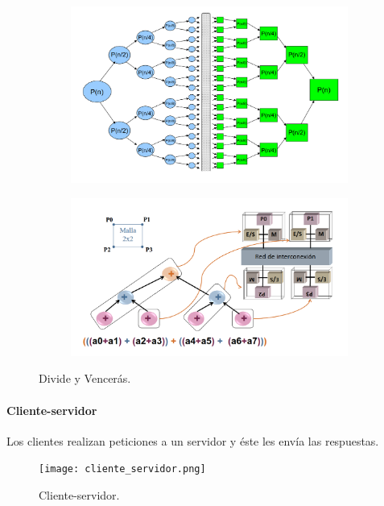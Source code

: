 \documentclass[12pt,spanish]{article}
\begin{document}
\begin{figure}[H]
\begin{subfigure}[b]{0.5\textwidth}
	\includegraphics[width=\textwidth]{dyv.png}
\end{subfigure}
\quad
\begin{subfigure}[b]{0.5\textwidth}
	\includegraphics[width=\textwidth]{dyv_2.png}
\end{subfigure}
\caption{Divide y Vencerás.}
\end{figure}

\paragraph{Cliente-servidor}

Los clientes realizan peticiones a un servidor y éste les envía las respuestas.

\begin{figure}[H]
	\centering
	\texttt{[image: cliente\_servidor.png]}
	\caption{Cliente-servidor.}
\end{figure}
\end{document}
